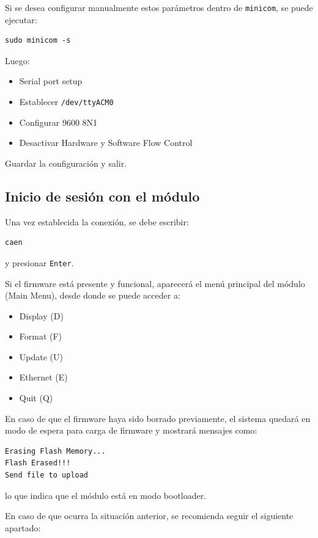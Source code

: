 \documentclass{article}
\begin{document}
Si se desea configurar manualmente estos parámetros dentro de \texttt{minicom}, se puede ejecutar:

\begin{verbatim}
sudo minicom -s
\end{verbatim}

Luego:

\begin{itemize}
    \item Serial port setup
    \item Establecer \texttt{/dev/ttyACM0}
    \item Configurar 9600 8N1
    \item Desactivar Hardware y Software Flow Control
\end{itemize}

Guardar la configuración y salir.

\subsection{Inicio de sesión con el módulo}

Una vez establecida la conexión, se debe escribir:

\begin{verbatim}
caen
\end{verbatim}

y presionar \texttt{Enter}.

Si el firmware está presente y funcional, aparecerá el menú principal del módulo (Main Menu), desde donde se puede acceder a:

\begin{itemize}
    \item Display (D)
    \item Format (F)
    \item Update (U)
    \item Ethernet (E)
    \item Quit (Q)
\end{itemize}

En caso de que el firmware haya sido borrado previamente, el sistema quedará en modo de espera para carga de firmware y mostrará mensajes como:

\begin{verbatim}
Erasing Flash Memory...
Flash Erased!!!
Send file to upload
\end{verbatim}

lo que indica que el módulo está en modo bootloader.

En caso de que ocurra la situación anterior, se recomienda seguir el siguiente apartado:
\end{document}
